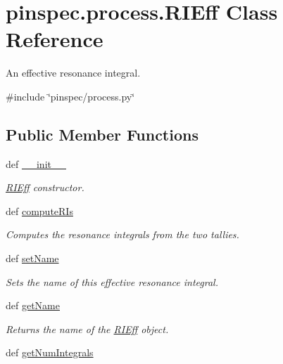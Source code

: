 \hypertarget{classpinspec_1_1process_1_1RIEff}{\section{pinspec.\-process.\-R\-I\-Eff Class Reference}
\label{classpinspec_1_1process_1_1RIEff}
}


An effective resonance integral.  




{\ttfamily \#include \char`\"{}pinspec/process.\-py\char`\"{}}

\subsection*{Public Member Functions}
\begin{DoxyCompactItemize}
\item 
def \hyperlink{classpinspec_1_1process_1_1RIEff_a509b004ebdb23bd0239706108256541c}{\-\_\-\-\_\-init\-\_\-\-\_\-}
\begin{DoxyCompactList}\small\item\em \hyperlink{classpinspec_1_1process_1_1RIEff}{R\-I\-Eff} constructor. \end{DoxyCompactList}\item 
def \hyperlink{classpinspec_1_1process_1_1RIEff_a821baa9dccb3c9a1aa9ebf5c1044059d}{compute\-R\-Is}
\begin{DoxyCompactList}\small\item\em Computes the resonance integrals from the two tallies. \end{DoxyCompactList}\item 
def \hyperlink{classpinspec_1_1process_1_1RIEff_a0a484c374d5285ec12506fc4bbc7f079}{set\-Name}
\begin{DoxyCompactList}\small\item\em Sets the name of this effective resonance integral. \end{DoxyCompactList}\item 
def \hyperlink{classpinspec_1_1process_1_1RIEff_abfe306d889c69c3bf739542617695a0a}{get\-Name}
\begin{DoxyCompactList}\small\item\em Returns the name of the \hyperlink{classpinspec_1_1process_1_1RIEff}{R\-I\-Eff} object. \end{DoxyCompactList}\item 
def \hyperlink{classpinspec_1_1process_1_1RIEff_ade5267dec68494c580c081f69ea91d84}{get\-Num\-Integrals}

\end{DoxyCompactItemize}
